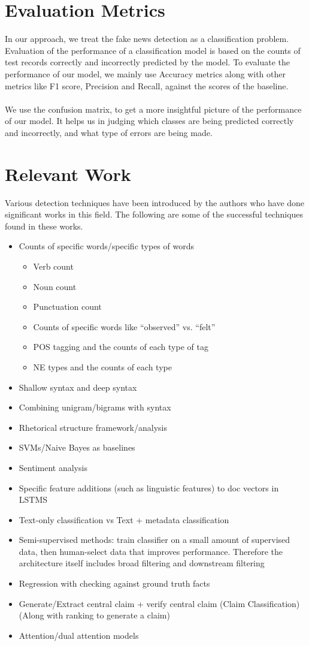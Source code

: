 \documentclass[14pt]{extarticle}
\begin{document}
\begin{multicols}{2}
\section{Evaluation Metrics}
In our approach, we treat the fake news detection as a classification problem. Evaluation of the performance of a classification model is based on the counts of test records correctly and incorrectly predicted by the model. To evaluate the performance of our model, we mainly use Accuracy metrics along with other metrics like F1 score, Precision and Recall, against the scores of the baseline.
\\\\We use the confusion matrix, to get a more insightful picture of the performance of our model. It helps us in judging which classes are being predicted correctly and incorrectly, and what type of errors are being made.
\section{Relevant Work}
Various detection techniques have been introduced by the authors who have done significant works in this field. The following are some of the successful techniques found in these works.
\begin{itemize}
\item Counts of specific words/specific types of words
\begin{itemize}
\item Verb count
\item Noun count
\item Punctuation count
\item Counts of specific words like “observed” vs. “felt”
\item POS tagging and the counts of each type of tag
\item NE types and the counts of each type
\end{itemize}
\item Shallow syntax and deep syntax
\item Combining unigram/bigrams with syntax
\item Rhetorical structure framework/analysis
\item SVMs/Naive Bayes as baselines
\item Sentiment analysis 
\item Specific feature additions (such as linguistic features) to doc vectors in LSTMS
\item Text-only classification vs Text + metadata classification
\item Semi-supervised methods: train classifier on a small amount of supervised data, then human-select data that improves performance. Therefore the architecture itself includes broad filtering and downstream filtering
\item Regression with checking against ground truth facts
\item Generate/Extract central claim + verify central claim (Claim Classification) (Along with ranking to generate a claim)
\item Attention/dual attention models
\end{itemize}

\end{multicols}
\end{document}
